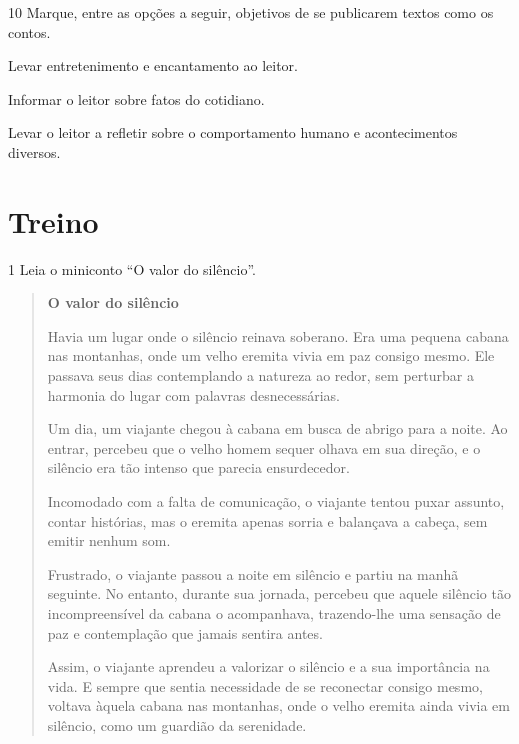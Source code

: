 \num{10} Marque, entre as opções a seguir, objetivos de se publicarem textos
como os contos.

\begin{boxlist}
 Levar entretenimento e encantamento ao leitor.

 Informar o leitor sobre fatos do cotidiano.

 Levar o leitor a refletir sobre o comportamento humano e
acontecimentos diversos.
\end{boxlist}

\section{Treino}

\num{1} Leia o miniconto ``O valor do silêncio''.

\begin{quote}
\textbf{O valor do silêncio}


Havia um lugar onde o silêncio reinava soberano. Era uma pequena cabana
nas montanhas, onde um velho eremita vivia em paz consigo mesmo. Ele
passava seus dias contemplando a natureza ao redor, sem perturbar a
harmonia do lugar com palavras desnecessárias.

Um dia, um viajante chegou à cabana em busca de abrigo para a noite. Ao
entrar, percebeu que o velho homem sequer olhava em sua direção, e o
silêncio era tão intenso que parecia ensurdecedor.

Incomodado com a falta de comunicação, o viajante tentou puxar assunto,
contar histórias, mas o eremita apenas sorria e balançava a cabeça, sem
emitir nenhum som.

Frustrado, o viajante passou a noite em silêncio e partiu na manhã
seguinte. No entanto, durante sua jornada, percebeu que aquele silêncio
tão incompreensível da cabana o acompanhava, trazendo-lhe uma sensação
de paz e contemplação que jamais sentira antes.

Assim, o viajante aprendeu a valorizar o silêncio e a sua importância na
vida. E sempre que sentia necessidade de se reconectar consigo mesmo,
voltava àquela cabana nas montanhas, onde o velho eremita ainda vivia em
silêncio, como um guardião da serenidade.

\end{quote}

